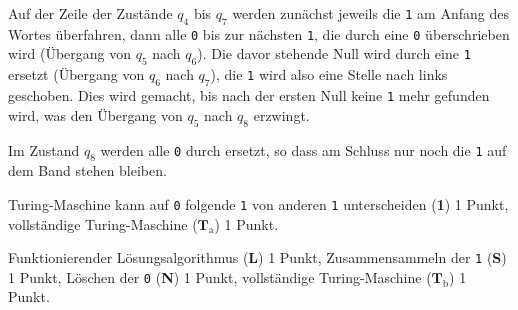 \begin{loesung}
\begin{teilaufgaben}
Auf der Zeile der Zustände $q_4$ bis $q_7$ werden zunächst jeweils die
\texttt{1} am Anfang des Wortes überfahren, dann alle \texttt{0} bis zur
nächsten \texttt{1}, die durch eine \texttt{0} überschrieben wird
(Übergang von $q_5$ nach $q_6$).
Die davor stehende Null wird durch eine \texttt{1} ersetzt
(Übergang von $q_6$ nach $q_7$), die \texttt{1} wird also eine
Stelle nach links geschoben.
Dies wird gemacht, bis nach der ersten Null keine \texttt{1} mehr gefunden
wird, was den Übergang von $q_5$ nach $q_8$ erzwingt.

Im Zustand $q_8$ werden alle \texttt{0} durch \blank{} ersetzt, so dass
am Schluss nur noch die \texttt{1} auf dem Band stehen bleiben.
\qedhere
\end{teilaufgaben}
\end{loesung}

\begin{bewertung}
\begin{teilaufgaben}
\item
Turing-Maschine kann auf \texttt{0} folgende \texttt{1} von anderen
\texttt{1} unterscheiden ({\bf 1}) 1 Punkt,
vollständige Turing-Maschine ($\textbf{T}_\text{a}$) 1 Punkt.
\item
Funktionierender Lösungsalgorithmus ({\bf L}) 1 Punkt,
Zusammensammeln der \texttt{1} ({\bf S}) 1 Punkt,
Löschen der \texttt{0} ({\bf N}) 1 Punkt,
vollständige Turing-Maschine ($\textbf{T}_\text{b}$) 1 Punkt.
\end{teilaufgaben}
\end{bewertung}

